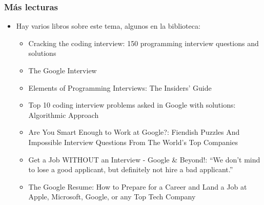 
\begin{frame}
\frametitle{Más lecturas}

\begin{itemize}
   \item Hay varios libros sobre este tema, algunos en la biblioteca:
   \begin{itemize}
     \item Cracking the coding interview: 150 programming interview questions and solutions
     \item The Google Interview
     \item Elements of Programming Interviews: The Insiders' Guide
     \item Top 10 coding interview problems asked in Google with solutions: Algorithmic Approach
     \item Are You Smart Enough to Work at Google?: Fiendish Puzzles And Impossible Interview Questions From The World's Top Companies
     \item Get a Job WITHOUT an Interview - Google \& Beyond!: ``We don't mind to lose a good applicant, but definitely not hire a bad applicant.''
     \item The Google Resume: How to Prepare for a Career and Land a Job at Apple, Microsoft, Google, or any Top Tech Company
   \end{itemize}
\end{itemize}

\end{frame}



